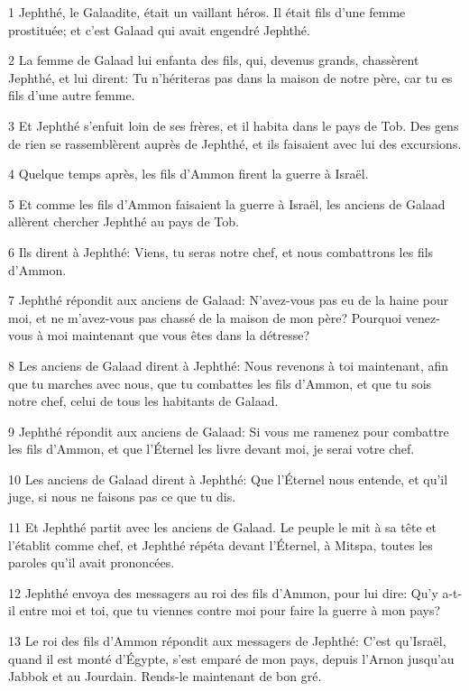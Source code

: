 \par 1 Jephthé, le Galaadite, était un vaillant héros. Il était fils d'une femme prostituée; et c'est Galaad qui avait engendré Jephthé.
\par 2 La femme de Galaad lui enfanta des fils, qui, devenus grands, chassèrent Jephthé, et lui dirent: Tu n'hériteras pas dans la maison de notre père, car tu es fils d'une autre femme.
\par 3 Et Jephthé s'enfuit loin de ses frères, et il habita dans le pays de Tob. Des gens de rien se rassemblèrent auprès de Jephthé, et ils faisaient avec lui des excursions.
\par 4 Quelque temps après, les fils d'Ammon firent la guerre à Israël.
\par 5 Et comme les fils d'Ammon faisaient la guerre à Israël, les anciens de Galaad allèrent chercher Jephthé au pays de Tob.
\par 6 Ils dirent à Jephthé: Viens, tu seras notre chef, et nous combattrons les fils d'Ammon.
\par 7 Jephthé répondit aux anciens de Galaad: N'avez-vous pas eu de la haine pour moi, et ne m'avez-vous pas chassé de la maison de mon père? Pourquoi venez-vous à moi maintenant que vous êtes dans la détresse?
\par 8 Les anciens de Galaad dirent à Jephthé: Nous revenons à toi maintenant, afin que tu marches avec nous, que tu combattes les fils d'Ammon, et que tu sois notre chef, celui de tous les habitants de Galaad.
\par 9 Jephthé répondit aux anciens de Galaad: Si vous me ramenez pour combattre les fils d'Ammon, et que l'Éternel les livre devant moi, je serai votre chef.
\par 10 Les anciens de Galaad dirent à Jephthé: Que l'Éternel nous entende, et qu'il juge, si nous ne faisons pas ce que tu dis.
\par 11 Et Jephthé partit avec les anciens de Galaad. Le peuple le mit à sa tête et l'établit comme chef, et Jephthé répéta devant l'Éternel, à Mitspa, toutes les paroles qu'il avait prononcées.
\par 12 Jephthé envoya des messagers au roi des fils d'Ammon, pour lui dire: Qu'y a-t-il entre moi et toi, que tu viennes contre moi pour faire la guerre à mon pays?
\par 13 Le roi des fils d'Ammon répondit aux messagers de Jephthé: C'est qu'Israël, quand il est monté d'Égypte, s'est emparé de mon pays, depuis l'Arnon jusqu'au Jabbok et au Jourdain. Rends-le maintenant de bon gré.
